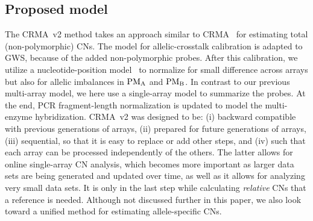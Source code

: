 \documentclass{bioinfo}
\newcommand{\GWS}{GWS\xspace}
\newcommand{\PMA}{\ensuremath{\textnormal{PM}_\textnormal{A}}\xspace}
\newcommand{\PMB}{\ensuremath{\textnormal{PM}_\textnormal{B}}\xspace}
\begin{document}
\subsection{Proposed model}

The CRMA~v2 method takes an approach similar to CRMA~\citep{BengtssonH_etal_2008} for estimating total (non-polymorphic) CNs.  The model for allelic-crosstalk calibration is adapted to \GWS, because of the added non-polymorphic probes.  After this calibration, we utilize a nucleotide-position model~\citep{CarvalhoB_etal_2007} to normalize for small difference across arrays but also for allelic imbalances in \PMA and \PMB.  
In contrast to our previous multi-array model, we here use a single-array model to summarize the probes.  At the end, PCR fragment-length normalization is updated to model the multi-enzyme hybridization.
CRMA~v2 was designed to be:
(i) backward compatible with previous generations of arrays,
(ii) prepared for future generations of arrays, 
(iii) sequential, so that it is easy to replace or add other steps, and
(iv) such that each array can be processed independently of the others.
The latter allows for online single-array CN analysis, which becomes more important as larger data sets are being generated and updated over time, as well as it allows for analyzing very small data sets.
It is only in the last step while calculating \emph{relative} CNs that a reference is needed.
Although not discussed further in this paper, we also look toward a unified method for estimating allele-specific CNs.
\end{document}
